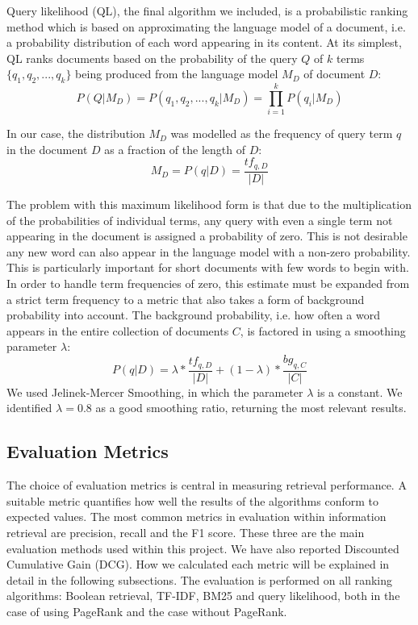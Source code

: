 Query likelihood (QL), the final algorithm we included, is a probabilistic ranking method which is based on approximating the language model of a document, i.e. a probability distribution of each word appearing in its content. At its simplest, QL ranks documents based on the probability of the query $Q$ of $k$ terms $\{q_1,q_2,...,q_k\}$ being produced from the language model $M_D$ of document $D$:
\[ P(Q | M_D) = P(q_1,q_2,...,q_k | M_D) = \prod_{i=1}^{k} P(q_i | M_D)\]

In our case, the distribution $M_D$ was modelled as the frequency of query term $q$ in the document $D$ as a fraction of the length of $D$:
\[ M_D = P(q | D) = \frac{tf_{q,D}}{|D|} \]

The problem with this maximum likelihood form is that due to the multiplication of the probabilities of individual terms, any query with even a single term not appearing in the document is assigned a probability of zero. This is not desirable any new word can also appear in the language model with a non-zero probability. This is particularly important for short documents with few words to begin with. In order to handle term frequencies of zero, this estimate must be expanded from a strict term frequency to a metric that also takes a form of background probability into account. The background probability, i.e. how often a word appears in the entire collection of documents $C$, is factored in using a smoothing parameter $\lambda$:
\[P(q | D) = \lambda * \frac{tf_{q,D}}{|D|} + (1 - \lambda) * \frac{bg_{q,C}}{|C|}\]
We used Jelinek-Mercer Smoothing, in which the parameter $\lambda$ is a constant. We identified $\lambda = 0.8$ as a good smoothing ratio, returning the most relevant results.




\subsection{Evaluation Metrics} %
\label{sub:metrics_&_analysis}

The choice of evaluation metrics is central in measuring retrieval performance. A suitable metric quantifies how well the results of the algorithms conform to expected values. The most common metrics in evaluation within information retrieval are precision, recall and the F1 score. These three are the main evaluation methods used within this project. We have also reported Discounted Cumulative Gain (DCG). How we calculated each metric will be explained in detail in the following subsections. The evaluation is performed on all ranking algorithms: Boolean retrieval, TF-IDF, BM25 and query likelihood, both in the case of using PageRank and the case without PageRank.

